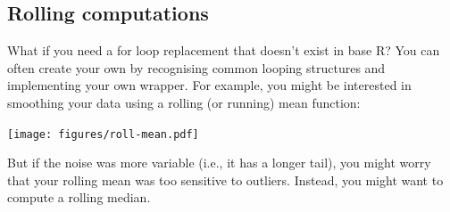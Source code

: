 \subsection{Rolling computations}

What if you need a for loop replacement that doesn't exist in base R?
You can often create your own by recognising common looping structures
and implementing your own wrapper. For example, you might be interested
in smoothing your data using a rolling (or running) mean function:

\begin{Shaded}
\begin{Highlighting}[]
\StringTok{ }
  \StringTok{ }\NormalTok{(}\NormalTok{, }

  \StringTok{ }\StringTok{ }\NormalTok{)}
  \StringTok{ }\NormalTok{):(}\StringTok{ }\StringTok{ }\StringTok{ }\NormalTok{)) \{}
    \StringTok{ }\NormalTok{(x[(i -}\StringTok{ }\StringTok{ }\StringTok{ }\NormalTok{)])}
  \NormalTok{\}}
\NormalTok{\}}
\StringTok{ }\NormalTok{(}\NormalTok{, }\NormalTok{, } \NormalTok{) +}\StringTok{ }\NormalTok{(}\NormalTok{)}
\NormalTok{(}\NormalTok{), } \NormalTok{, } \NormalTok{)}
\NormalTok{(}\NormalTok{), } \NormalTok{, } \NormalTok{)}
\end{Highlighting}
\end{Shaded}

\texttt{[image: figures/roll-mean.pdf]}

But if the noise was more variable (i.e., it has a longer tail), you
might worry that your rolling mean was too sensitive to outliers.
Instead, you might want to compute a rolling median.

